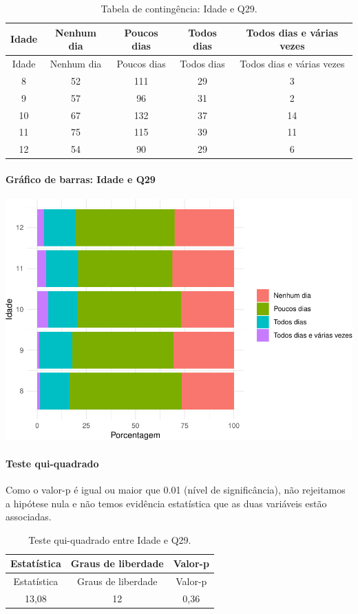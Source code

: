 \documentclass[]{article}
\let\oldparagraph\paragraph
\renewcommand{\paragraph}[1]{\oldparagraph{#1}\mbox{}}
\begin{document}
\begin{longtable}[]{@{}ccccc@{}}
\caption{\label{tab:unnamed-chunk-918}Tabela de contingência: Idade e Q29.}\tabularnewline
\toprule
Idade & Nenhum dia & Poucos dias & Todos dias & Todos dias e várias vezes\tabularnewline
\midrule
\endfirsthead
\toprule
Idade & Nenhum dia & Poucos dias & Todos dias & Todos dias e várias vezes\tabularnewline
\midrule
\endhead
8 & 52 & 111 & 29 & 3\tabularnewline
9 & 57 & 96 & 31 & 2\tabularnewline
10 & 67 & 132 & 37 & 14\tabularnewline
11 & 75 & 115 & 39 & 11\tabularnewline
12 & 54 & 90 & 29 & 6\tabularnewline
\bottomrule
\end{longtable}

\hypertarget{gruxe1fico-de-barras-idade-e-q29}{%
\paragraph{Gráfico de barras: Idade e Q29}\label{gruxe1fico-de-barras-idade-e-q29}}

\begin{center}\includegraphics[width=0.75\linewidth]{relatorio_covid19_files/figure-latex/unnamed-chunk-919-1} \end{center}

\hypertarget{teste-qui-quadrado-79}{%
\paragraph{Teste qui-quadrado}\label{teste-qui-quadrado-79}}

Como o valor-p é igual ou maior que 0.01 (nível de significância), não rejeitamos a hipótese nula e não temos evidência estatística que as duas variáveis estão associadas.

\begin{longtable}[]{@{}ccc@{}}
\caption{\label{tab:unnamed-chunk-921}Teste qui-quadrado entre Idade e Q29.}\tabularnewline
\toprule
Estatística & Graus de liberdade & Valor-p\tabularnewline
\midrule
\endfirsthead
\toprule
Estatística & Graus de liberdade & Valor-p\tabularnewline
\midrule
\endhead
13,08 & 12 & 0,36\tabularnewline
\bottomrule
\end{longtable}
\end{document}
